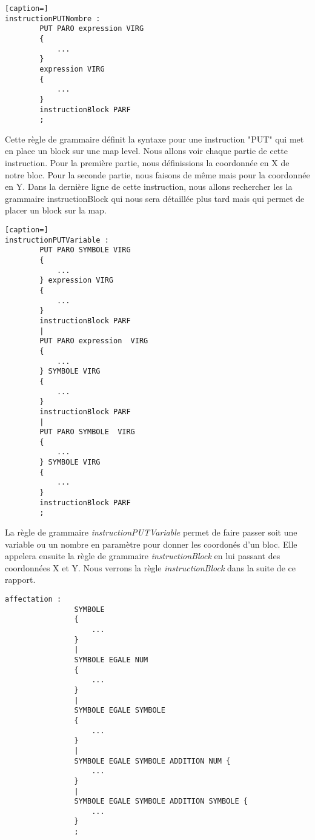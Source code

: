 \newpage

\lstset{style=mystyle}
\begin{lstlisting}[caption=]
instructionPUTNombre : 
        PUT PARO expression VIRG  
        {
            ...
        } 
        expression VIRG 
        {
            ...
        }
        instructionBlock PARF
        ;
\end{lstlisting}

Cette règle de grammaire définit la syntaxe pour une instruction "PUT" qui met en place un block sur une map level.
Nous allons voir chaque partie de cette instruction.
Pour la première partie, nous définissions la coordonnée en X de notre bloc. Pour la seconde partie, nous faisons de même mais pour la coordonnée en Y. Dans la dernière ligne de cette instruction, nous allons rechercher les la grammaire instructionBlock qui nous sera détaillée plus tard mais qui permet de placer un block sur la map.

\lstset{style=mystyle}
\begin{lstlisting}[caption=]
instructionPUTVariable :
        PUT PARO SYMBOLE VIRG
        {
            ...
        } expression VIRG 
        {
            ...
        }
        instructionBlock PARF
        |
        PUT PARO expression  VIRG
        {
            ...
        } SYMBOLE VIRG 
        {
            ...
        }
        instructionBlock PARF
        |
        PUT PARO SYMBOLE  VIRG
        {
            ...
        } SYMBOLE VIRG 
        {
            ...
        }
        instructionBlock PARF
        ;   
\end{lstlisting}

La règle de grammaire \textit{instructionPUTVariable} permet de faire passer soit une variable ou un nombre en paramètre pour donner les coordonés d'un bloc. Elle appelera ensuite la règle de grammaire \textit{instructionBlock} en lui passant des coordonnées X et Y. Nous verrons la règle \textit{instructionBlock} dans la suite de ce rapport.

\lstset{style=mystyle}
\begin{lstlisting}[caption=Affectation d'un symbole]
    affectation : 
                SYMBOLE 
                {
                    ...
                }
                |
                SYMBOLE EGALE NUM 
                {
                    ...
                }
                |
                SYMBOLE EGALE SYMBOLE 
                {
                    ...
                }
                |
                SYMBOLE EGALE SYMBOLE ADDITION NUM {
                    ...
                }
                |
                SYMBOLE EGALE SYMBOLE ADDITION SYMBOLE {
                    ...
                }
                ;
\end{lstlisting}

